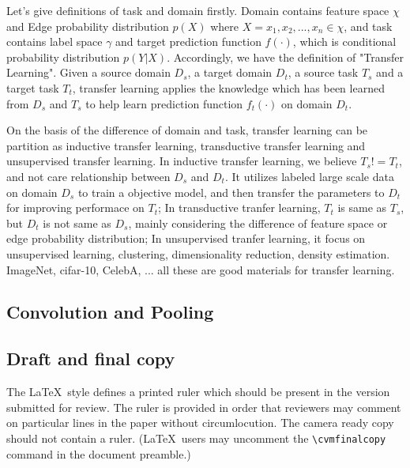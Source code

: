 \documentclass[10pt,twocolumn,letterpaper]{article}
\begin{document}
    Let's give definitions of task and domain firstly. Domain contains feature space $\chi$ and Edge probability distribution $p(X)$ where $X = {x_1, x_2, ..., x_n}\in{\chi}$, and task contains label space $\gamma$ and target prediction function $f(\cdot)$, which is conditional probability distribution $p(Y|X)$. Accordingly, we have the definition of "Transfer Learning". Given a source domain $D_s$, a target domain $D_t$, a source task $T_s$ and a target task $T_t$, transfer learning applies the knowledge which has been learned from $D_s$ and $T_s$ to help learn prediction function ${f_t}(\cdot)$ on domain $D_t$.

    On the basis of the difference of domain and task, transfer learning can be partition as inductive transfer learning, transductive transfer learning and unsupervised transfer learning. In inductive transfer learning, we believe $T_s != T_t$, and not care relationship between $D_s$ and $D_t$. It utilizes labeled large scale data on domain $D_s$ to train a objective model, and then transfer the parameters to $D_t$ for improving performace on $T_t$; In transductive tranfer learning, $T_t$ is same as $T_s$, but $D_t$ is not same as $D_s$, mainly considering the difference of feature space or edge probability distribution; In unsupervised tranfer learning, it focus on unsupervised learning, \eg clustering, dimensionality reduction, density estimation. ImageNet, cifar-10, CelebA, ... all these are good materials for transfer learning.

\subsection{Convolution and Pooling}

\subsection{Draft and final copy}
The \LaTeX\ style defines a printed ruler which should be present in the
version submitted for review.  The ruler is provided in order that
reviewers may comment on particular lines in the paper without
circumlocution. The camera ready copy should not contain a ruler.
(\LaTeX\ users may uncomment the \verb'\cvmfinalcopy' command in the document preamble.)
\end{document}
